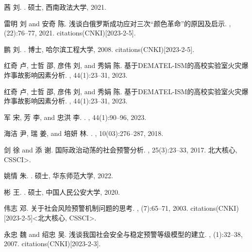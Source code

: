 \begin{thebibliography}{100}
	茜 刘.
	.
	\newblock 硕士, 西南政法大学, 2021.
	
	雷明 刘 and 安奇 陈.
	\newblock
	浅谈白俄罗斯成功应对三次“颜色革命”的原因及启示.
	, (22):76--77, 2021.
	 citations(CNKI)[2023-2-5].
	
	鹏 刘.
	.
	\newblock 博士, 哈尔滨工程大学, 2008.
	 citations(CNKI)[2023-2-5].
	
	红奇 卢, 士哲 邵, 彦伟 刘, and 秀娟 陈.
	\newblock
	{基于DEMATEL}-{ISM的高校实验室火灾爆炸事故影响因素分析}.
	, 44(1):23--31, 2023.
	
	红奇 卢, 士哲 邵, 彦伟 刘, and 秀娟 陈.
	\newblock
	{基于DEMATEL}-{ISM的高校实验室火灾爆炸事故影响因素分析}.
	, 44(1):23--31, 2023.
	
	

	军 宋, 芳 李, and 忠洪 李.
	.
	, 44(1):90--96, 2023.
	
	海洁 尹, 瑞 姜, and 培妍 林.
	.
	, 10(03):276--287,
	2018.
	
	
	剑 徐 and 添 谢.
	\newblock 国际政治动荡的社会预警分析.
	, 25(3):23--33,
	2017.
	\newblock {\textless}北大核心, CSSCI{\textgreater}.
	
		
	姚情 朱.
	.
	\newblock 硕士, 华东师范大学, 2022.
	

	
	彬 王.
	.
	\newblock 硕士, 中国人民公安大学, 2020.
		
	
	

	
	伟志 邓.
	\newblock 关于社会风险预警机制问题的思考.
	, (7):65--71, 2003.
	 citations(CNKI)[2023-2-5]{\textless}北大核心,
	CSSCI{\textgreater}.
	

	
	永忠 魏 and 绍忠 吴.
	\newblock 浅谈我国社会安全与稳定预警等级模型的建立.
	, (1):32--38, 2007.
	 citations(CNKI)[2023-2-3].
	
	
\end{thebibliography}
